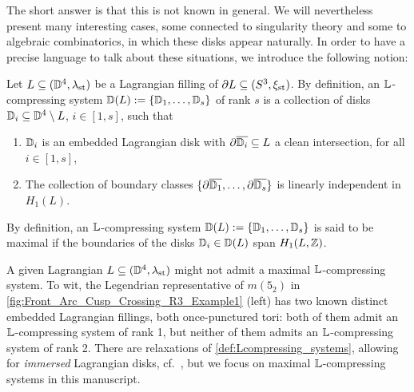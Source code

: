 \noindent The short answer is that this is not known in general. We will nevertheless present many interesting cases, some connected to singularity theory and some to algebraic combinatorics, in which these disks appear naturally. In order to have a precise language to talk about these situations, we introduce the following notion:

\begin{fdef}\label{def:Lcompressing_systems} Let $L\subseteq (\mathbb{D}^4,\lambda_{\text{st}})$ be a Lagrangian filling of $\partial L\subseteq(S^3,\xi_{\text{st}})$. By definition, an $\mathbb{L}$-compressing system $\mathbb{D}(L):=\{\mathbb{D}_1,\ldots,\mathbb{D}_s\}$ of rank $s$ is a collection of disks $\mathbb{D}_i\subseteq \mathbb{D}^4\setminus L$, $i\in[1,s]$, such that\\
\begin{enumerate}
    \item $\mathbb{D}_i$ is an embedded Lagrangian disk with $\partial\overline{\mathbb{D}_i}\subseteq L$ a clean intersection, for all $i\in[1,s]$,\\
    \item The collection of boundary classes $\{\partial\overline{\mathbb{D}_1},\ldots,\partial\overline{\mathbb{D}_s}\}$ is linearly independent in $H_1(L)$.\\
\end{enumerate}
By definition, an $\mathbb{L}$-compressing system $\mathbb{D}(L):=\{\mathbb{D}_1,\ldots,\mathbb{D}_s\}$ is said to be maximal if the boundaries of the disks $\mathbb{D}_i\in\mathbb{D}(L)$ span $H_1(L,\mathbb{Z})$.\sbs
\end{fdef}
\vspace{0.2cm}
\noindent A given Lagrangian $L\subseteq (\mathbb{D}^4,\lambda_{\text{st}})$ might not admit a maximal $\mathbb{L}$-compressing system. To wit, the Legendrian representative of $m(5_2)$ in \cref{fig:Front_Arc_Cusp_Crossing_R3_Example1} (left) has two known distinct embedded Lagrangian fillings, both once-punctured tori: both of them admit an $\mathbb{L}$-compressing system of rank 1, but neither of them admits an $\mathbb{L}$-compressing system of rank 2. There are relaxations of \cref{def:Lcompressing_systems}, allowing for {\it immersed} Lagrangian disks, cf.~\cite[Section 3]{CasalsWeng22}, but we focus on maximal $\mathbb{L}$-compressing systems in this manuscript.

